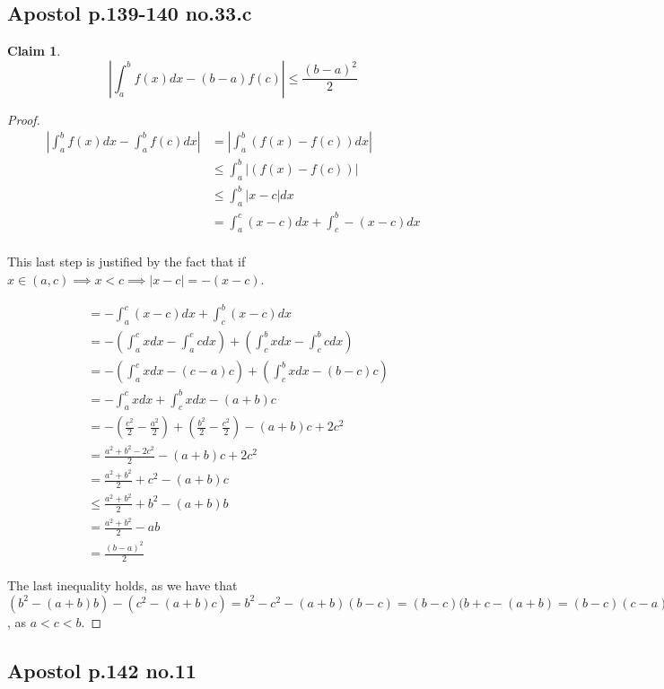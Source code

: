 \documentclass[12pt,letterpaper]{article}
\theoremstyle{definition}
\newtheorem*{claim}{Claim}
\begin{document}
\subsection*{Apostol p.139-140 no.33.c}

\begin{claim}
  \[
    \left| \int_a^bf(x)dx - (b-a)f(c) \right| \leq \frac{(b-a)^2}{2}
  \]
\end{claim}

\begin{proof}
  \begin{align*}
    \left|\int_a^bf(x)dx - \int_a^bf(c)dx\right| &= \left|\int_a^b(f(x) - f(c))dx\right| \\
    &\leq \int_a^b|(f(x) - f(c))| \\
    &\leq \int_a^b|x - c|dx \\
    &= \int_a^c(x-c)dx + \int_c^b-(x-c)dx \\
  \end{align*}

  This last step is justified by the fact that if $x \in (a,c) \implies x < c
  \implies |x-c| = -(x-c)$.
  
  \begin{align*}
    &= -\int_a^c(x-c)dx + \int_c^b(x-c)dx \\
    &= -(\int_a^cxdx - \int_a^ccdx) + (\int_c^b xdx - \int_c^b cdx) \\
    &= -(\int_a^c xdx - (c-a)c) + (\int_c^b xdx - (b-c)c) \\
    &= -\int_a^cxdx + \int_c^bxdx - (a+b)c \\
    &= -(\frac{c^2}{2} - \frac{a^2}{2}) + (\frac{b^2}{2} - \frac{c^2}{2}) - (a+b)c + 2c^2 \\
    &= \frac{a^2 + b^2 - 2c^2}{2} - (a+b)c + 2c^2 \\
    &= \frac{a^2 + b^2}{2} + c^2 - (a+b)c \\
    &\leq \frac{a^2 + b^2}{2} + b^2 - (a+b)b \\
    &= \frac{a^2 + b^2}{2} - ab \\
    &= \frac{(b-a)^2}{2}
  \end{align*}

  The last inequality holds, as we have that $(b^2 - (a+b)b) - (c^2 - (a+b)c) =
  b^2 - c^2 - (a+b)(b-c) = (b-c)(b+c - (a+b) = (b-c)(c-a) > 0$, as $a < c < b$.
\end{proof}


\subsection*{Apostol p.142 no.11}
\end{document}
